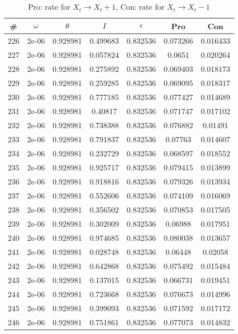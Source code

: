 \newpage
\begin{table}
\caption{Pro: rate for $X_t \rightarrow X_t + 1$, Con: rate for $X_t \rightarrow X_t - 1$}
\begin{tabular*}{\linewidth}{c|c|c|c|c|c|c}
\# & $\omega$ & $\theta$ & $I$ & $\epsilon$ & Pro & Con \\
\hline
226 & 2e-06 & 0.928981 & 0.499683 & 0.832536 & 0.073266 & 0.016433\\
227 & 2e-06 & 0.928981 & 0.057824 & 0.832536 & 0.0651 & 0.020264\\
228 & 2e-06 & 0.928981 & 0.275892 & 0.832536 & 0.069403 & 0.018173\\
229 & 2e-06 & 0.928981 & 0.259285 & 0.832536 & 0.069095 & 0.018317\\
230 & 2e-06 & 0.928981 & 0.777185 & 0.832536 & 0.077427 & 0.014689\\
231 & 2e-06 & 0.928981 & 0.40817 & 0.832536 & 0.071747 & 0.017102\\
232 & 2e-06 & 0.928981 & 0.738388 & 0.832536 & 0.076882 & 0.01491\\
233 & 2e-06 & 0.928981 & 0.791837 & 0.832536 & 0.07763 & 0.014607\\
234 & 2e-06 & 0.928981 & 0.232729 & 0.832536 & 0.068597 & 0.018552\\
235 & 2e-06 & 0.928981 & 0.925717 & 0.832536 & 0.079415 & 0.013899\\
236 & 2e-06 & 0.928981 & 0.918816 & 0.832536 & 0.079326 & 0.013934\\
237 & 2e-06 & 0.928981 & 0.552606 & 0.832536 & 0.074109 & 0.016069\\
238 & 2e-06 & 0.928981 & 0.356502 & 0.832536 & 0.070853 & 0.017505\\
239 & 2e-06 & 0.928981 & 0.302009 & 0.832536 & 0.06988 & 0.017951\\
240 & 2e-06 & 0.928981 & 0.974685 & 0.832536 & 0.080038 & 0.013657\\
241 & 2e-06 & 0.928981 & 0.028748 & 0.832536 & 0.06448 & 0.02058\\
242 & 2e-06 & 0.928981 & 0.642868 & 0.832536 & 0.075492 & 0.015484\\
243 & 2e-06 & 0.928981 & 0.137015 & 0.832536 & 0.066731 & 0.019451\\
244 & 2e-06 & 0.928981 & 0.723668 & 0.832536 & 0.076673 & 0.014996\\
245 & 2e-06 & 0.928981 & 0.399093 & 0.832536 & 0.071592 & 0.017172\\
246 & 2e-06 & 0.928981 & 0.751861 & 0.832536 & 0.077073 & 0.014832\\

\end{tabular*}
\end{table}
